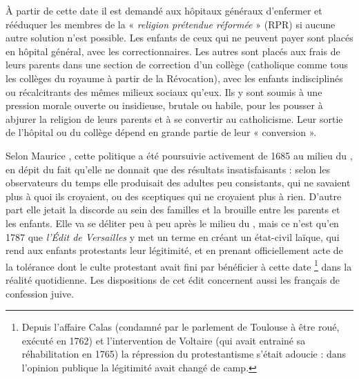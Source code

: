  À partir de cette date il est demandé aux hôpitaux généraux d'enfermer et rééduquer les membres de la « \emph{religion prétendue réformée} » (RPR) si aucune autre solution n'est possible. Les enfants de ceux qui ne peuvent payer sont placés en hôpital général, avec les correctionnaires. Les autres sont placés aux frais de leurs parents dans une section de correction d'un collège (catholique comme tous les collèges du royaume à partir de la Révocation), avec les enfants indisciplinés ou récalcitrants des mêmes milieux sociaux qu'eux. Ils y sont soumis à une pression morale ouverte ou insidieuse, brutale ou habile, pour les pousser à abjurer la religion de leurs parents et à se convertir au catholicisme. Leur sortie de l'hôpital ou du collège dépend en grande partie de leur « conversion ». 

 Selon Maurice , cette politique a été poursuivie activement de 1685 au milieu du , en dépit du fait qu'elle ne donnait que des résultats insatisfaisants : selon les observateurs du temps elle produisait des adultes peu consistants, qui ne savaient plus à quoi ils croyaient, ou des sceptiques qui ne croyaient plus à rien. D'autre part elle jetait la discorde au sein des familles et la brouille entre les parents et les enfants. Elle va se déliter peu à peu après le milieu du , mais ce n'est qu'en 1787 que \emph{l'Édit de Versailles} y met un terme en créant un état-civil laïque, qui rend aux enfants protestants leur légitimité, et en prenant officiellement acte de la tolérance dont le culte protestant avait fini par bénéficier à cette date%
\footnote{Depuis l'affaire Calas (condamné par le parlement de Toulouse à être roué, exécuté en 1762) et l'intervention de Voltaire (qui avait entrainé sa réhabilitation en 1765) la répression du protestantisme s'était adoucie : dans l'opinion publique la légitimité avait changé de camp.} 
dans la réalité quotidienne. Les dispositions de cet édit concernent aussi les français de confession juive.


